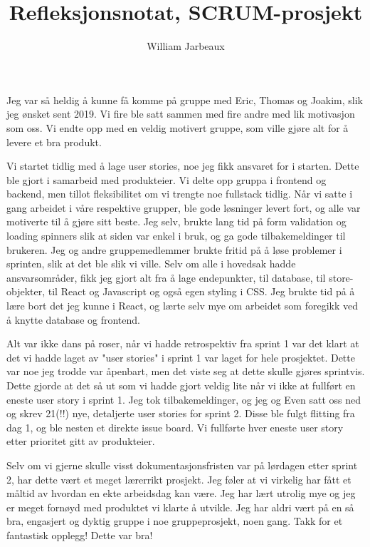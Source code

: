 \documentclass{article}
\title{Refleksjonsnotat, SCRUM-prosjekt}
\author{William Jarbeaux}
\begin{document}
    \maketitle
    \begin{flushleft}
    Jeg var så heldig å kunne få komme på gruppe med Eric, Thomas og Joakim, slik jeg ønsket sent 2019. 
    Vi fire ble satt sammen med fire andre med lik motivasjon som oss. Vi endte opp med en veldig motivert gruppe, som ville gjøre alt for å levere et bra produkt. 
    
    \bigskip
    Vi startet tidlig med å lage user stories, noe jeg fikk ansvaret for i starten. Dette ble gjort i samarbeid med produkteier. Vi delte opp gruppa i frontend og backend, men tillot fleksibilitet om vi trengte noe fullstack tidlig.
    Når vi satte i gang arbeidet i våre respektive grupper, ble gode løsninger levert fort, og alle var motiverte til å gjøre sitt beste. Jeg selv, brukte lang tid på form validation og loading spinners slik at siden var enkel i bruk, og ga gode tilbakemeldinger til brukeren.
    Jeg og andre gruppemedlemmer brukte fritid på å løse problemer i sprinten, slik at det ble slik vi ville.
    Selv om alle i hovedsak hadde ansvarsområder, fikk jeg gjort alt fra å lage endepunkter, til database, til store-objekter, til React og Javascript og også egen styling i CSS.
    Jeg brukte tid på å lære bort det jeg kunne i React, og lærte selv mye om arbeidet som foregikk ved å knytte database og frontend. 
    
    \bigskip
    Alt var ikke dans på roser, når vi hadde retrospektiv fra sprint 1 var det klart at det vi hadde laget av "user stories" i sprint 1 var laget for hele prosjektet. Dette var noe jeg trodde var åpenbart, men det viste seg at dette skulle gjøres sprintvis.
    Dette gjorde at det så ut som vi hadde gjort veldig lite når vi ikke at fullført en eneste user story i sprint 1. 
    Jeg tok tilbakemeldinger, og jeg og Even satt oss ned og skrev 21(!!) nye, detaljerte user stories for sprint 2. 
    Disse ble fulgt flitting fra dag 1, og ble nesten et direkte issue board. Vi fullførte hver eneste user story etter prioritet gitt av produkteier.
    
    
    \bigskip
    Selv om vi gjerne skulle visst dokumentasjonsfristen var på lørdagen etter sprint 2, har dette vært et meget lærerrikt prosjekt.
    Jeg føler at vi virkelig har fått et måltid av hvordan en ekte arbeidsdag kan være. Jeg har lært utrolig mye og jeg er meget fornøyd med produktet vi klarte å utvikle. 
    Jeg har aldri vært på en så bra, engasjert og dyktig gruppe i noe gruppeprosjekt, noen gang.
    Takk for et fantastisk opplegg! Dette var bra!

    \end{flushleft}
\end{document}
